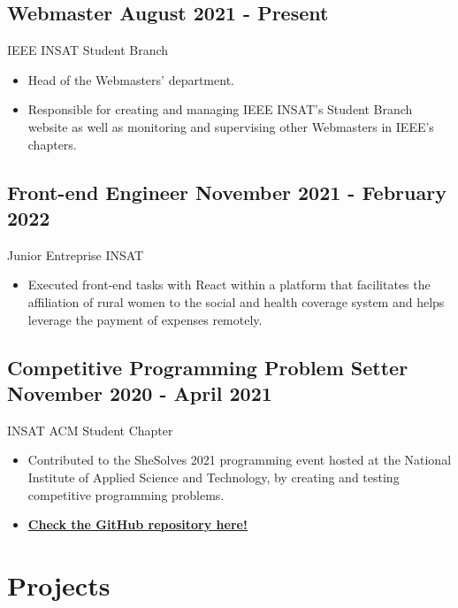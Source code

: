 \documentclass[a4,10pt]{article}
\newcommand{\subtext}[1]{
#1\par\vspace{-0.2cm}}
\newenvironment{zitemize}{
\begin{itemize}\itemsep0pt \parskip0pt \parsep1pt}
{\end{itemize}\vspace{-0.5cm}}
\begin{document}
\subsection*{Webmaster \hfill August 2021 - Present} 
\subtext{IEEE INSAT Student Branch\hfill } 
    \begin{zitemize}
        \item   Head of the Webmasters' department.
        \item  Responsible for creating and managing IEEE INSAT's Student Branch website as well as monitoring and supervising other Webmasters in IEEE's chapters.
                        

    \end{zitemize}
    
\subsection*{ Front-end Engineer \hfill November 2021 - February 2022} 
\subtext{Junior Entreprise INSAT\hfill } 
    \begin{zitemize}
        \item  Executed front-end tasks with React within a platform that facilitates the affiliation of rural women to the social and health coverage system and helps leverage the payment of expenses remotely.
        
    \end{zitemize}

\subsection*{Competitive Programming Problem Setter \hfill November 2020 - April 2021} 
\subtext{INSAT ACM Student Chapter \hfill } 
    \begin{zitemize}
        \item  Contributed to the SheSolves 2021 programming event hosted at the National Institute of Applied Science and Technology, by creating and testing competitive programming problems.
         \item \href{https://github.com/sirajeddineaissa/SheSolves2021-INSAT}{\small \textbf {Check the GitHub repository here!}}
    \end{zitemize}
  


\section{Projects} %
\end{document}
